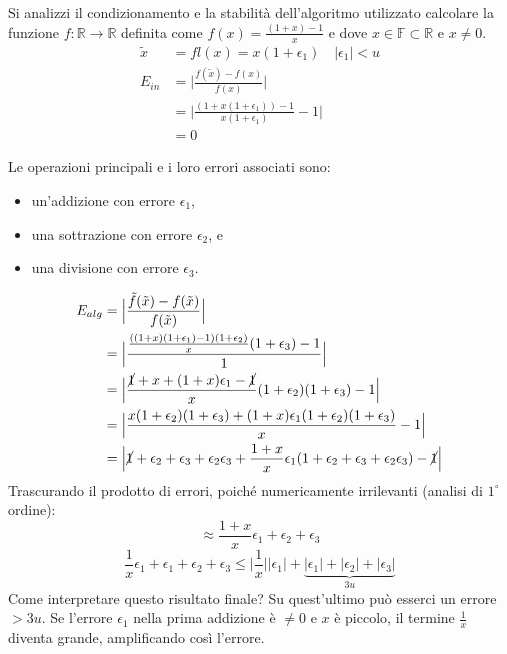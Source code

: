 \documentclass{article}
\begin{document}
\begin{example}
   Si analizzi il condizionamento e la stabilità dell'algoritmo utilizzato calcolare la funzione $f:\mathbb{R}\rightarrow
   \mathbb{R}$ definita come $f(x)=\frac{(1+x)-1}{x}$ e dove $x\in
   \mathbb{F}\subset \mathbb{R}\text{ e }x\neq0$.
   \begin{equation*}
        \begin{aligned}
           \tilde{x}&=fl(x)=x(1+\epsilon_1) & \lvert\epsilon_1\rvert < u \\
           E_{in}&=\Big\lvert \frac{f(\tilde{x})-f(x)}{f(x)}\Big\rvert\\ 
                 &=\Big\lvert
                 \frac{(1+x(1+\epsilon_1))-1}{x(1+\epsilon_1)}-1\Big\rvert\\ 
                 &=0
       \end{aligned} 
   \end{equation*}
    
   Le operazioni principali e i loro errori associati sono:
   \begin{itemize}
        \item un'addizione con errore $\epsilon_1$,
        \item una sottrazione con errore $\epsilon_2$, e
        \item una divisione con errore $\epsilon_3$.
   \end{itemize}

   \begin{equation*}
       \begin{aligned}
           E_{alg}&=\Big\lvert\frac{\tilde{f}(\tilde{x})-f(\tilde{x})}{f(\tilde{x})}\Big\rvert\\ 
                  &=\Big\lvert
                  \frac{\frac{((1+x)(1+\epsilon_1)-1)(1+\epsilon_2)}{x}(1+\epsilon_3)-1}{1}\Big\rvert\\ 
                  &=\Big\lvert
                  \frac{\cancel{1}+x+(1+x)\epsilon_1-\cancel{1}}{x}(1+\epsilon_2)(1+\epsilon_3)-1\Big\rvert\\ 
                  &=\Big\lvert
                  \frac{x(1+\epsilon_2)(1+\epsilon_3)+(1+x)\epsilon_1(1+\epsilon_2)(1+\epsilon_3)}{x}-1\Big\rvert\\ 
                  &=\Big\lvert
                  \cancel{1}+\epsilon_2+\epsilon_3+\epsilon_2\epsilon_3+\frac{1+x}{x}\epsilon_1(1+\epsilon_2+\epsilon_3+\epsilon_2\epsilon_3)-\cancel{1}\Big\rvert
       \end{aligned}
   \end{equation*}
   Trascurando il prodotto di errori, poiché numericamente irrilevanti
   (analisi di $1^{\circ}$ ordine):
   $$\approx \frac{1+x}{x}\epsilon_1+\epsilon_2+\epsilon_3$$
   $$\frac{1}{x}\epsilon_1+\epsilon_1+\epsilon_2+\epsilon_3\leq \Big\lvert
   \frac{1}{x}\Big\rvert \lvert \epsilon_1\rvert + \underbrace{\lvert \epsilon_1\rvert +
\lvert \epsilon_2\rvert + \lvert \epsilon_3\rvert}_{3u}$$
    Come interpretare questo risultato finale? Su quest'ultimo può esserci un
    errore $>3u$. Se l'errore $\epsilon_1$ nella prima addizione è $\neq0$ e
    $x$ è piccolo, il termine $\frac{1}{x}$ diventa grande, amplificando così
    l'errore.
\end{example}
\end{document}
